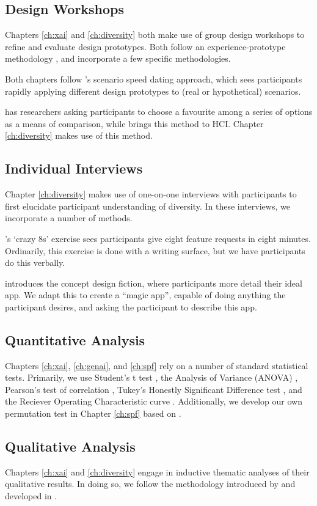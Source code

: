 \subsection{Design Workshops}
Chapters \ref{ch:xai} and \ref{ch:diversity} both make use of group design workshops to refine and evaluate design prototypes. Both follow an experience-prototype methodology \cite{Buchenau_Suri_2000}, and incorporate a few specific methodologies.

Both chapters follow \textcite{Zimmerman_Forlizzi_2017}'s scenario speed dating approach, which sees participants rapidly applying different design prototypes to (real or hypothetical) scenarios.

\textcite{Gatian_1994} has researchers asking participants to choose a favourite among a series of options as a means of comparison, while \textcite{Griffiths_Johnson_Hartley_2007} brings this method to HCI. Chapter \ref{ch:diversity} makes use of this method.

\subsection{Individual Interviews}
Chapter \ref{ch:diversity} makes use of one-on-one interviews with participants to first elucidate participant understanding of diversity. In these interviews, we incorporate a number of methods.

\textcite{Knapp_Zeratzky_Kowitz_2016}'s `crazy 8s' exercise sees participants give eight feature requests in eight minutes. Ordinarily, this exercise is done with a writing surface, but we have participants do this verbally.

\textcite{blythe2014research} introduces the concept design fiction, where participants more detail their ideal app. We adapt this to create a ``magic app'', capable of doing anything the participant desires, and asking the participant to describe this app.

\subsection{Quantitative Analysis}
Chapters \ref{ch:xai}, \ref{ch:genai}, and \ref{ch:spf} rely on a number of standard statistical tests. Primarily, we use Student's t test \cite{Mishra_Singh_Pandey_Mishra_Pandey_2019}, the Analysis of Variance (ANOVA) \cite{Mishra_Singh_Pandey_Mishra_Pandey_2019}, Pearson's test of correlation \cite{Schober_Boer_Schwarte_2018}, Tukey's Honestly Significant Difference test \cite{Kim_2015}, and the Reciever Operating Characteristic curve \cite{hanley1989receiver}. Additionally, we develop our own permutation test in Chapter \ref{ch:spf} based on \textcite{good2013permutation}.

\subsection{Qualitative Analysis}
Chapters \ref{ch:xai} and \ref{ch:diversity} engage in inductive thematic analyses of their qualitative results. In doing so, we follow the methodology introduced by \textcite{braun_using_2006} and developed in \textcite{braun_conceptual_2022,braun_toward_2023,noauthor_thematic_nodate}.